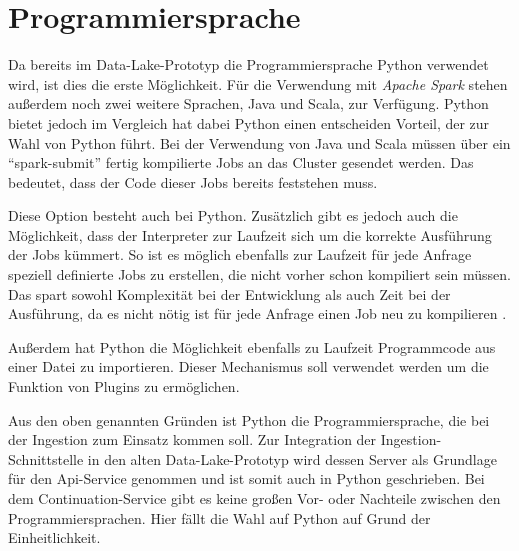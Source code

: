 \section{Programmiersprache}
Da bereits im Data-Lake-Prototyp die Programmiersprache Python verwendet wird, ist dies die erste Möglichkeit.
Für die Verwendung mit \textit{Apache Spark} stehen außerdem noch zwei weitere Sprachen, Java und Scala, zur Verfügung.
Python bietet jedoch im Vergleich hat dabei Python einen entscheiden Vorteil, der zur Wahl von Python führt.
Bei der Verwendung von Java und Scala müssen über ein "`spark-submit"' fertig kompilierte Jobs an das Cluster gesendet werden.
Das bedeutet, dass der Code dieser Jobs bereits feststehen muss.

Diese Option besteht auch bei Python.
Zusätzlich gibt es jedoch auch die Möglichkeit, dass der Interpreter zur Laufzeit sich um die korrekte Ausführung der Jobs kümmert.
So ist es möglich ebenfalls zur Laufzeit für jede Anfrage speziell definierte Jobs zu erstellen, die nicht vorher schon kompiliert sein müssen.
Das spart sowohl Komplexität bei der Entwicklung als auch Zeit bei der Ausführung, da es nicht nötig ist für jede Anfrage einen Job neu zu kompilieren \parencite{pyspark-int}.

Außerdem hat Python die Möglichkeit ebenfalls zu Laufzeit Programmcode aus einer Datei zu importieren.
Dieser Mechanismus soll verwendet werden um die Funktion von Plugins zu ermöglichen.

Aus den oben genannten Gründen ist Python die Programmiersprache, die bei der Ingestion zum Einsatz kommen soll.
Zur Integration der Ingestion-Schnittstelle in den alten Data-Lake-Prototyp wird dessen Server als Grundlage für den Api-Service genommen und ist somit auch in Python geschrieben.
Bei dem Continuation-Service gibt es keine großen Vor- oder Nachteile zwischen den Programmiersprachen.
Hier fällt die Wahl auf Python auf Grund der Einheitlichkeit.

